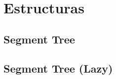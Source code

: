 

\def\title{Universidad Nacional del Sur - Mastropiero Unlimited}


 
%

\section{Estructuras}%
\subsection{Segment Tree}
\subsection{Segment Tree (Lazy)}
